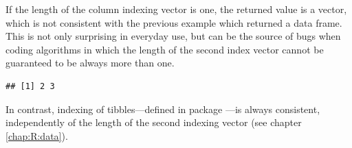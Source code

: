 \documentclass[krantz2]{krantz}\usepackage{knitr}%
\begin{document}
\begin{explainbox}
If the length of the column indexing vector is one, the returned value is a vector, which is not consistent with the previous example which returned a data frame. This is not only surprising in everyday use, but can be the source of bugs when coding algorithms in which the length of the second index vector cannot be guaranteed to be always more than one.

\begin{knitrout}\footnotesize
{}\color{fgcolor}\begin{kframe}
\begin{alltt}
\hlstd{a.df[}\hlopt{:}\hlstd{,} \hlstd{]}
\end{alltt}
\begin{verbatim}
## [1] 2 3
\end{verbatim}
\end{kframe}
\end{knitrout}

In contrast, indexing of tibbles---defined in package ---is always consistent, independently of the length of the second indexing vector (see chapter \ref{chap:R:data}).
\end{explainbox}
\end{document}
